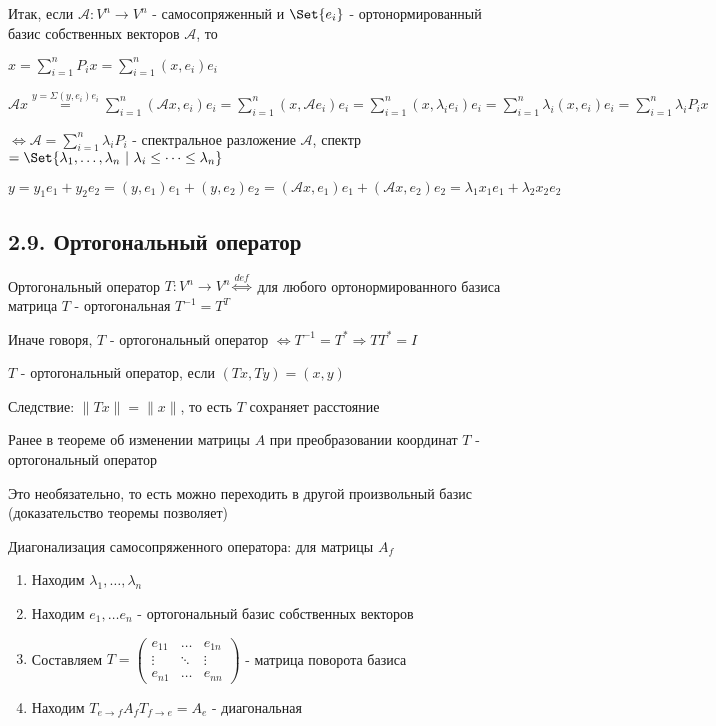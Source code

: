 \documentclass[12pt]{article}
\begin{document}
    Итак, если $\mathcal{A}: V^n \to V^n$ - самосопряженный и $\Set{e_i}$ - ортонормированный базис собственных векторов $\mathcal{A}$, то

    $x = \sum_{i = 1}^{n} P_i x = \sum_{i = 1}^{n} (x, e_i) e_i$

    $\mathcal{A} x \stackrel{y = \Sigma (y, e_i) e_i}{=} \sum_{i = 1}^{n} (\mathcal{A}x, e_i) e_i =
    \sum_{i = 1}^{n} (x, \mathcal{A}e_i) e_i = \sum_{i = 1}^{n} (x, \lambda_i e_i) e_i =
    \sum_{i = 1}^{n} \lambda_i (x, e_i) e_i = \sum_{i = 1}^{n} \lambda_i P_i x$

    $\Longleftrightarrow \mathcal{A} = \sum_{i = 1}^{n} \lambda_i P_i$ - спектральное разложение $\mathcal{A}$,
    спектр $= \Set{\lambda_1, \dots, \lambda_n \ | \ \lambda_i \leq \dots \leq \lambda_n}$

    \Ex $y = y_1 e_1 + y_2 e_2 = (y, e_1) e_1 + (y, e_2) e_2 = (\mathcal{A}x, e_1) e_1 + (\mathcal{A}x, e_2) e_2 = \lambda_1 x_1 e_1 + \lambda_2 x_2 e_2$

    \subsection{2.9. Ортогональный оператор}

    \hypertarget{orthogonaloperator}{}

    \Mem Ортогональный оператор $T: V^n \to V^n \overset{def}{\Longleftrightarrow}$ для любого ортонормированного базиса матрица $T$ - ортогональная $T^{-1} = T^T$

    \Nota Иначе говоря, $T$ - ортогональный оператор $\Longleftrightarrow T^{-1} = T^* \Longrightarrow T T^* = I$

    \Def $T$ - ортогональный оператор, если $(Tx, Ty) = (x, y)$

    Следствие: $\|Tx\| = \|x\|$, то есть $T$ сохраняет расстояние

    \Nota Ранее в теореме об изменении матрицы $A$ при преобразовании координат $T$ - ортогональный оператор

    Это необязательно, то есть можно переходить в другой произвольный базис (доказательство теоремы позволяет)

    Диагонализация самосопряженного оператора: для матрицы $A_f$

    \begin{enumerate}
        \item Находим $\lambda_1, \dots, \lambda_n$

        \item Находим $e_1, \dots e_n$ - ортогональный базис собственных векторов

        \item Составляем $T = \begin{pmatrix}e_{11} & \dots & e_{1n} \\ \vdots & \ddots & \vdots \\ e_{n1} & \dots & e_{nn}\end{pmatrix}$ - матрица поворота базиса

        \item Находим $T_{e\to f}A_f T_{f\to e} = A_e$ - диагональная
    \end{enumerate}
\end{document}
